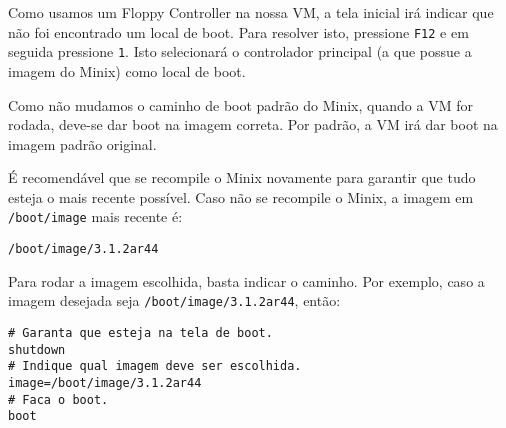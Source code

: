 \documentclass{amsart}
\theoremstyle{plain}
\newcommand{\code}[1]{\lstinline[mathescape=true]{#1}}
\begin{document}
Como usamos um Floppy Controller na nossa VM, a tela inicial irá indicar que não foi encontrado um
local de boot. Para resolver isto, pressione \code{F12} e em seguida pressione \code{1}. Isto
selecionará o controlador principal (a que possue a imagem do Minix) como local de boot.

Como não mudamos o caminho de boot padrão do Minix, quando a VM for rodada, deve-se dar boot na
imagem correta. Por padrão, a VM irá dar boot na imagem padrão original.

É recomendável que se recompile o Minix novamente para garantir que tudo esteja o mais recente
possível. Caso não se recompile o Minix, a imagem em \code{/boot/image} mais recente é:

\begin{lstlisting}[frame=leftline,mathescape=true,style=nonumbers]
/boot/image/3.1.2ar44
\end{lstlisting}

Para rodar a imagem escolhida, basta indicar o caminho. Por exemplo, caso a imagem desejada seja
\code{/boot/image/3.1.2ar44}, então:

\begin{lstlisting}[frame=leftline,mathescape=true,style=nonumbers]
# Garanta que esteja na tela de boot.
shutdown
# Indique qual imagem deve ser escolhida.
image=/boot/image/3.1.2ar44
# Faca o boot.
boot
\end{lstlisting}
\end{document}
